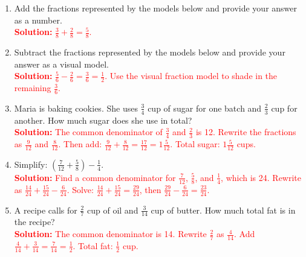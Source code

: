\documentclass[11pt]{article}
\begin{document}
\begin{tcolorbox}[colframe=black!60, colback=white, 
coltitle=black, colbacktitle=black!15, fonttitle=\bfseries\Large, 
title=Exercises, halign title=center, left=10pt, right=10pt, top=10pt, bottom=60pt]
\begin{enumerate}[itemsep=2em]

    \item Add the fractions represented by the models below and provide your answer as a number.\\
    \textcolor{red}{\textbf{Solution:} \( \frac{3}{8} + \frac{2}{8} = \frac{5}{8} \).}

    \item Subtract the fractions represented by the models below and provide your answer as a visual model.\\
    \textcolor{red}{\textbf{Solution:} \( \frac{5}{6} - \frac{2}{6} = \frac{3}{6} = \frac{1}{2} \). Use the visual fraction model to shade in the remaining \( \frac{3}{6} \).}

    \item Maria is baking cookies. She uses \( \frac{3}{4} \) cup of sugar for one batch and \( \frac{2}{3} \) cup for another. How much sugar does she use in total?\\
    \textcolor{red}{\textbf{Solution:} The common denominator of \( \frac{3}{4} \) and \( \frac{2}{3} \) is 12. Rewrite the fractions as \( \frac{9}{12} \) and \( \frac{8}{12} \). Then add: \( \frac{9}{12} + \frac{8}{12} = \frac{17}{12} = 1 \frac{5}{12} \). Total sugar: \( 1 \frac{5}{12} \) cups.}

    \item Simplify: \( \left( \frac{7}{12} + \frac{5}{8} \right) - \frac{1}{4} \).\\
    \textcolor{red}{\textbf{Solution:} Find a common denominator for \( \frac{7}{12} \), \( \frac{5}{8} \), and \( \frac{1}{4} \), which is 24. Rewrite as \( \frac{14}{24} + \frac{15}{24} - \frac{6}{24} \). Solve: \( \frac{14}{24} + \frac{15}{24} = \frac{29}{24} \), then \( \frac{29}{24} - \frac{6}{24} = \frac{23}{24} \).}

    \item A recipe calls for \( \frac{2}{7} \) cup of oil and \( \frac{3}{14} \) cup of butter. How much total fat is in the recipe?\\
    \textcolor{red}{\textbf{Solution:} The common denominator is 14. Rewrite \( \frac{2}{7} \) as \( \frac{4}{14} \). Add \( \frac{4}{14} + \frac{3}{14} = \frac{7}{14} = \frac{1}{2} \). Total fat: \( \frac{1}{2} \) cup.}

\end{enumerate}
\end{tcolorbox}
\end{document}
